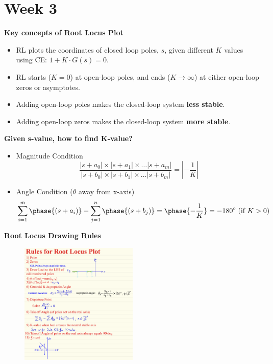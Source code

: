 \section{Week 3}
\textbf{Key concepts of Root Locus Plot}
\begin{itemize}
    \item RL plots the coordinates of closed loop poles, $s$, given different $K$ values using CE: $1+K\cdot G(s) = 0$.
    \item RL starts ($K=0$) at open-loop poles, and ends ($K\to \infty$) at either open-loop zeros or asymptotes. 
    \item Adding open-loop poles makes the closed-loop system \textbf{less stable}.
    \item Adding open-loop zeros makes the closed-loop system \textbf{more stable}. 
\end{itemize}

\textbf{Given s-value, how to find K-value?}
\begin{itemize}
    \item Magnitude Condition \\
    \begin{equation*}
        \frac{|s+a_0|\times |s+a_1| \times \ldots |s+a_m|}{|s+b_0|\times |s+b_1| \times \ldots |s+b_m|} = \left|-\frac{1}{K}\right|
    \end{equation*}
    \item Angle Condition ($\theta$ away from x-axis) \\
    \begin{equation*}
        \sum_{i=1}^{m} \phase{(s+a_i)} - \sum_{j=1}^{n}\phase{(s+b_j)} = \phase{-\frac{1}{K}} = -180^{\circ} \; (\text{if $K>0$})
    \end{equation*}
\end{itemize}

\textbf{Root Locus Drawing Rules}
\begin{figure}[H]
    \centering
    \includegraphics[width=0.5\textwidth]{images/root_locus_rules.png}
\end{figure}